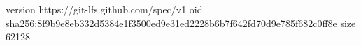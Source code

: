 version https://git-lfs.github.com/spec/v1
oid sha256:8f9b9e8eb332d5384e1f3500ed9e31ed2228b6b7f642fd70d9e785f682c0ff8e
size 62128
